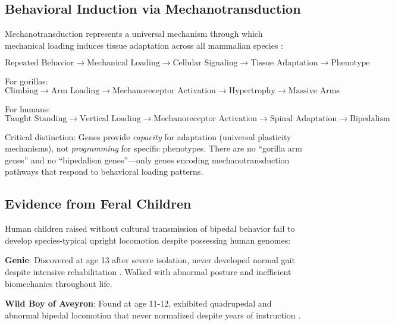 \subsection{Behavioral Induction via Mechanotransduction}

Mechanotransduction represents a universal mechanism through which mechanical loading induces tissue adaptation across all mammalian species \citep{ingber2006cellular}:

\begin{equation}
\text{Repeated Behavior} \rightarrow \text{Mechanical Loading} \rightarrow \text{Cellular Signaling} \rightarrow \text{Tissue Adaptation} \rightarrow \text{Phenotype}
\end{equation}

For gorillas:
\begin{equation}
\text{Climbing} \rightarrow \text{Arm Loading} \rightarrow \text{Mechanoreceptor Activation} \rightarrow \text{Hypertrophy} \rightarrow \text{Massive Arms}
\end{equation}

For humans:
\begin{equation}
\text{Taught Standing} \rightarrow \text{Vertical Loading} \rightarrow \text{Mechanoreceptor Activation} \rightarrow \text{Spinal Adaptation} \rightarrow \text{Bipedalism}
\end{equation}

Critical distinction: Genes provide \textit{capacity} for adaptation (universal plasticity mechanisms), not \textit{programming} for specific phenotypes. There are no ``gorilla arm genes'' and no ``bipedalism genes''—only genes encoding mechanotransduction pathways that respond to behavioral loading patterns.

\subsection{Evidence from Feral Children}

Human children raised without cultural transmission of bipedal behavior fail to develop species-typical upright locomotion despite possessing human genomes:

\textbf{Genie}: Discovered at age 13 after severe isolation, never developed normal gait despite intensive rehabilitation \citep{curtiss1977genie}. Walked with abnormal posture and inefficient biomechanics throughout life.

\textbf{Wild Boy of Aveyron}: Found at age 11-12, exhibited quadrupedal and abnormal bipedal locomotion that never normalized despite years of instruction \citep{lane1976wild}.

